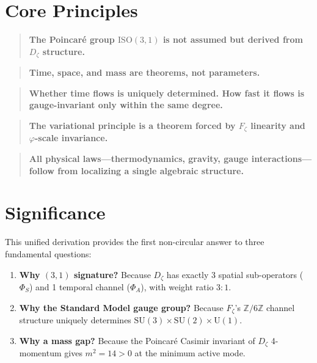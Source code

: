\section{Core Principles}
\label{sec:mat_core_principles}

\begin{quote}
\textbf{The Poincar\'{e} group $\mathrm{ISO}(3,1)$ is not assumed but derived from $D_\zeta$ structure.}
\end{quote}

\begin{quote}
\textbf{Time, space, and mass are theorems, not parameters.}
\end{quote}

\begin{quote}
\textbf{Whether time flows is uniquely determined. How fast it flows is gauge-invariant only within the same degree.}
\end{quote}

\begin{quote}
\textbf{The variational principle is a theorem forced by $F_\zeta$ linearity and $\varphi$-scale invariance.}
\end{quote}

\begin{quote}
\textbf{All physical laws---thermodynamics, gravity, gauge interactions---follow from localizing a single algebraic structure.}
\end{quote}

\section{Significance}
\label{sec:mat_final_significance}

This unified derivation provides the first non-circular answer to three fundamental questions:

\begin{enumerate}
\item \textbf{Why $(3,1)$ signature?} Because $D_\zeta$ has exactly 3 spatial sub-operators ($\Phi_S$) and 1 temporal channel ($\Phi_A$), with weight ratio $3:1$.
\item \textbf{Why the Standard Model gauge group?} Because $F_\zeta$'s $\mathbb{Z}/6\mathbb{Z}$ channel structure uniquely determines $\mathrm{SU}(3) \times \mathrm{SU}(2) \times \mathrm{U}(1)$.
\item \textbf{Why a mass gap?} Because the Poincar\'{e} Casimir invariant of $D_\zeta$ 4-momentum gives $m^2 = 14 > 0$ at the minimum active mode.
\end{enumerate}


